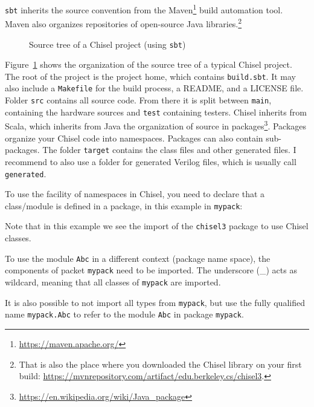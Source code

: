 \documentclass[%
    10pt,
    headinclude, footexclude,
    openright, %
    notitlepage,
    cleardoubleempty,
    headsepline,
    pointlessnumbers,
    bibtotoc, idxtotoc,
    ]{scrbook}
\newcommand{\code}[1]{{\small{\texttt{#1}}}}
\newcommand{\myref}[2]{\href{#1}{#2}}
\renewcommand{\myref}[2]{{#2}{\footnote{\url{#1}}}}
\begin{document}

\code{sbt} inherits the source convention from the \myref{https://maven.apache.org/}{Maven}
build automation tool. Maven also organizes repositories of open-source Java libraries.\footnote{That is
also the place where you downloaded the Chisel library on your first build:
\url{https://mvnrepository.com/artifact/edu.berkeley.cs/chisel3}.}

\begin{figure}
\caption{Source tree of a Chisel project (using \code{sbt})}
\label{fig:folders}
\end{figure}

Figure~\ref{fig:folders} shows the organization of the source tree of a typical Chisel project.
The root of the project is the project home, which contains \code{build.sbt}.
It may also include a \code{Makefile} for the build process, a README, and a LICENSE file.
Folder \code{src} contains all source code. From there it is split between \code{main},
containing the hardware sources and \code{test} containing testers.
Chisel inherits from Scala, which inherits from Java the organization of source
in \myref{https://en.wikipedia.org/wiki/Java_package}{packages}.
Packages organize your Chisel code into namespaces. Packages can also contain
sub-packages.
The folder \code{target} contains the class files and other generated files.
I recommend to also use a folder for generated Verilog files, which is usually
call \code{generated}.


To use the facility of namespaces in Chisel, you need to declare that a class/module
is defined in a package, in this example in \code{mypack}:


\noindent Note that in this example we see the import of the \code{chisel3} package
to use Chisel classes.

To use the module \code{Abc} in a different context (package name space),
the components of packet \code{mypack} need to be imported. The underscore
(\_) acts as wildcard, meaning that all classes of \code{mypack} are imported.


\noindent It is also possible to not import all types from \code{mypack},
but use the fully qualified name \code{mypack.Abc} to refer to the module
\code{Abc} in package \code{mypack}.
\end{document}
